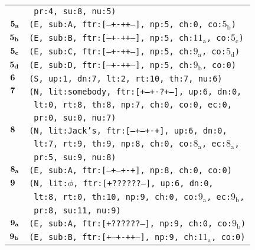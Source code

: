 \documentclass{article}
\begin{document}
\begin{minipage}{\textwidth}
{\begin{tabular}{|r|l|}
    & \texttt{\texttt{~pr:4,~su:8,~nu:5)}} \\
    ${\textbf{\textrm{5}}_{\textbf{\textrm{a}}}}$ & \texttt{\texttt{(E,~sub:A,~ftr:[---+-++--],~np:5,~ch:0,~co:${\textrm{5}_{\textrm{b}}}$)}} \\
    ${\textbf{\textrm{5}}_{\textbf{\textrm{b}}}}$ & \texttt{\texttt{(E,~sub:B,~ftr:[---+-++--],~np:5,~ch:${\textrm{11}_{\textrm{a}}}$,~co:${\textrm{5}_{\textrm{c}}}$)}} \\
    ${\textbf{\textrm{5}}_{\textbf{\textrm{c}}}}$ & \texttt{\texttt{(E,~sub:C,~ftr:[---+-++--],~np:5,~ch:${\textrm{9}_{\textrm{a}}}$,~co:${\textrm{5}_{\textrm{d}}}$)}} \\
    ${\textbf{\textrm{5}}_{\textbf{\textrm{d}}}}$ & \texttt{\texttt{(E,~sub:D,~ftr:[---+-++--],~np:5,~ch:${\textrm{9}_{\textrm{b}}}$,~co:0)}} \\
    ${\textbf{\textrm{6}}_{\phantom{z}}}$ & \texttt{\texttt{(S,~up:1,~dn:7,~lt:2,~rt:10,~th:7,~nu:6)}} \\
    ${\textbf{\textrm{7}}_{\phantom{z}}}$ & \texttt{\texttt{(N,~lit:somebody,~ftr:[+--+-?+--],~up:6,~dn:0,}} \\
    & \texttt{\texttt{~lt:0,~rt:8,~th:8,~np:7,~ch:0,~co:0,~ec:0,}} \\
    & \texttt{\texttt{~pr:0,~su:0,~nu:7)}} \\
    ${\textbf{\textrm{8}}_{\phantom{z}}}$ & \texttt{\texttt{(N,~lit:Jack's,~ftr:[---+--+-+],~up:6,~dn:0,}} \\
    & \texttt{\texttt{~lt:7,~rt:9,~th:9,~np:8,~ch:0,~co:${\textrm{8}_{\textrm{a}}}$,~ec:${\textrm{8}_{\textrm{a}}}$,}} \\
    & \texttt{\texttt{~pr:5,~su:9,~nu:8)}} \\
    ${\textbf{\textrm{8}}_{\textbf{\textrm{a}}}}$ & \texttt{\texttt{(E,~sub:A,~ftr:[---+--+-+],~np:8,~ch:0,~co:0)}} \\
    ${\textbf{\textrm{9}}_{\phantom{z}}}$ & \texttt{\texttt{(N,~lit:$\phi$,~ftr:[+??????--],~up:6,~dn:0,}} \\
    & \texttt{\texttt{~lt:8,~rt:0,~th:10,~np:9,~ch:0,~co:${\textrm{9}_{\textrm{a}}}$,~ec:${\textrm{9}_{\textrm{b}}}$,}} \\
    & \texttt{\texttt{~pr:8,~su:11,~nu:9)}} \\
    ${\textbf{\textrm{9}}_{\textbf{\textrm{a}}}}$ & \texttt{\texttt{(E,~sub:A,~ftr:[+??????--],~np:9,~ch:0,~co:${\textrm{9}_{\textrm{b}}}$)}} \\
    ${\textbf{\textrm{9}}_{\textbf{\textrm{b}}}}$ & \texttt{\texttt{(E,~sub:B,~ftr:[+--+-++--],~np:9,~ch:${\textrm{11}_{\textrm{a}}}$,~co:0)}} \\

\end{tabular}}
\end{minipage}
\end{document}

